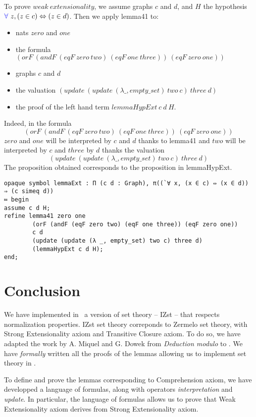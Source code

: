 \documentclass[a4paper]{article}
\begin{document}
To prove $weak \ extensionality$, we assume graphs $c$ and $d$, and $H$ the hypothesis ${\color{blue} \forall}~z, (z \in c) \Leftrightarrow (z \in d)$. Then we apply lemma41 to:

\begin{itemize}
\item nats $zero$ and $one$
\item the formula $(orF~(andF~(eqF~zero~two)~(eqF~one~three))~(eqF~zero~one))$
\item graphs $c$ and $d$
\item the valuation $(update~(update~(\lambda \_, empty\_set)~two~c)~three~d)$ 
\item the proof of the left hand term $lemmaHypExt~c~d~H$.
\end{itemize}

Indeed, in the formula $$(orF~(andF~(eqF~zero~two)~(eqF~one~three))~(eqF~zero~one))$$ $zero$ and $one$ will be interpreted by $c$ and $d$ thanks to lemma41 and $two$ will be interpreted by $c$ and $three$ by $d$ thanks the valuation $$(update~(update~(\lambda \_, empty\_set)~two~c)~three~d)$$ The proposition obtained corresponds to the proposition in lemmaHypExt.


\begin{lstlisting}
opaque symbol lemmaExt : Π (c d : Graph), π((`∀ x, (x ∈ c) ⇔ (x ∈ d)) ⇒ (c simeq d))
≔ begin
assume c d H;
refine lemma41 zero one 
		(orF (andF (eqF zero two) (eqF one three)) (eqF zero one)) 
		c d 
		(update (update (λ _, empty_set) two c) three d) 
		(lemmaHypExt c d H);
end;
\end{lstlisting}

\section{Conclusion}

We have implemented in \dedukti ~a version of set theory -- IZst -- that respects normalization properties. IZst set theory correponds to Zermelo set theory, with Strong Extensionality axiom and Transitive Closure axiom. To do so, we have adapted the work by A. Miquel and G. Dowek \cite{zermodulo} from \textit{Deduction modulo} to \lpcm. We have \textit{formally} written all the proofs of the lemmas allowing us to implement set theory in \dedukti.


To define and prove the lemmas corresponding to Comprehension axiom, we have developped a language of formulas, along with operators \textit{interpretation} and \textit{update}. In particular, the language of formulas allows us to prove that Weak Extensionality axiom derives from Strong Extensionality axiom.
\end{document}
